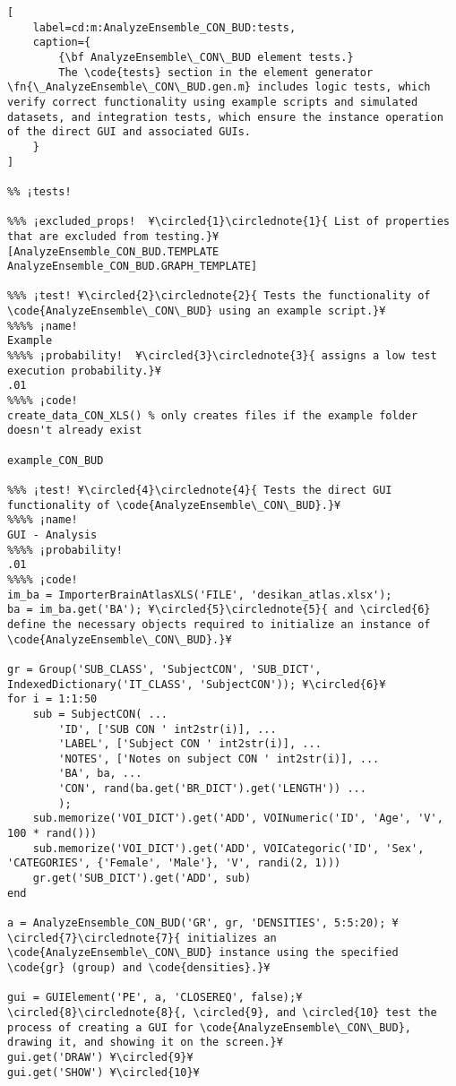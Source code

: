 \documentclass{tufte-handout}
\begin{document}
\begin{lstlisting}[
	label=cd:m:AnalyzeEnsemble_CON_BUD:tests,
	caption={
		{\bf AnalyzeEnsemble\_CON\_BUD element tests.}
		The \code{tests} section in the element generator \fn{\_AnalyzeEnsemble\_CON\_BUD.gen.m} includes logic tests, which verify correct functionality using example scripts and simulated datasets, and integration tests, which ensure the instance operation of the direct GUI and associated GUIs.
	}
]	

%% ¡tests!

%%% ¡excluded_props!  ¥\circled{1}\circlednote{1}{ List of properties that are excluded from testing.}¥
[AnalyzeEnsemble_CON_BUD.TEMPLATE AnalyzeEnsemble_CON_BUD.GRAPH_TEMPLATE]

%%% ¡test! ¥\circled{2}\circlednote{2}{ Tests the functionality of \code{AnalyzeEnsemble\_CON\_BUD} using an example script.}¥
%%%% ¡name!
Example
%%%% ¡probability!  ¥\circled{3}\circlednote{3}{ assigns a low test execution probability.}¥
.01
%%%% ¡code!
create_data_CON_XLS() % only creates files if the example folder doesn't already exist

example_CON_BUD

%%% ¡test! ¥\circled{4}\circlednote{4}{ Tests the direct GUI functionality of \code{AnalyzeEnsemble\_CON\_BUD}.}¥
%%%% ¡name!
GUI - Analysis
%%%% ¡probability!
.01
%%%% ¡code!
im_ba = ImporterBrainAtlasXLS('FILE', 'desikan_atlas.xlsx');
ba = im_ba.get('BA'); ¥\circled{5}\circlednote{5}{ and \circled{6} define the necessary objects required to initialize an instance of \code{AnalyzeEnsemble\_CON\_BUD}.}¥

gr = Group('SUB_CLASS', 'SubjectCON', 'SUB_DICT', IndexedDictionary('IT_CLASS', 'SubjectCON')); ¥\circled{6}¥
for i = 1:1:50 
    sub = SubjectCON( ...
        'ID', ['SUB CON ' int2str(i)], ...
        'LABEL', ['Subject CON ' int2str(i)], ...
        'NOTES', ['Notes on subject CON ' int2str(i)], ...
        'BA', ba, ...
        'CON', rand(ba.get('BR_DICT').get('LENGTH')) ...
        );
    sub.memorize('VOI_DICT').get('ADD', VOINumeric('ID', 'Age', 'V', 100 * rand()))
    sub.memorize('VOI_DICT').get('ADD', VOICategoric('ID', 'Sex', 'CATEGORIES', {'Female', 'Male'}, 'V', randi(2, 1)))
    gr.get('SUB_DICT').get('ADD', sub)
end

a = AnalyzeEnsemble_CON_BUD('GR', gr, 'DENSITIES', 5:5:20); ¥\circled{7}\circlednote{7}{ initializes an \code{AnalyzeEnsemble\_CON\_BUD} instance using the specified \code{gr} (group) and \code{densities}.}¥

gui = GUIElement('PE', a, 'CLOSEREQ', false);¥\circled{8}\circlednote{8}{, \circled{9}, and \circled{10} test the process of creating a GUI for \code{AnalyzeEnsemble\_CON\_BUD}, drawing it, and showing it on the screen.}¥
gui.get('DRAW') ¥\circled{9}¥
gui.get('SHOW') ¥\circled{10}¥


\end{lstlisting}
\end{document}
